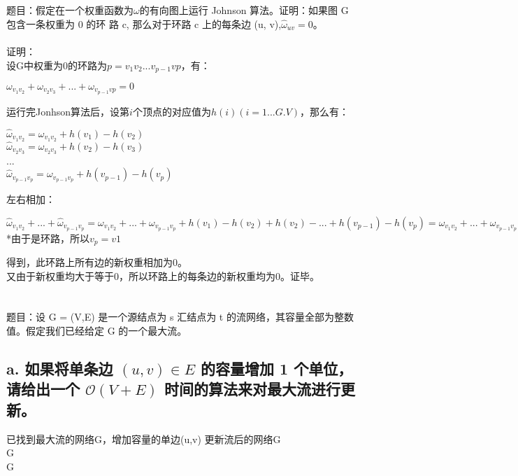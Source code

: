 \documentclass[UTF8]{ctexart}
\begin{document}
\section{}
题目：假定在一个权重函数为$\omega$的有向图上运行 Johnson 算法。证明：如果图 G 包含一条权重为 0 的环
路 c, 那么对于环路 c 上的每条边 (u, v),$\hat{\omega}_{uv}=0$。\\\\
证明：\\
设G中权重为0的环路为$p=v_1v_2...v_{p-1}v{p}$，有：
\begin{center}
$\omega_{v_1v_2}+\omega_{v_2v_3}+...+\omega_{v_{p-1}v{p}}=0$
\end{center}
运行完Jonhson算法后，设第$i$个顶点的对应值为$h(i)(i=1...G.V)$，那么有：
\begin{center}
$\hat{\omega}_{v_1v_2}=\omega_{v_1v_2}+h(v_1)-h(v_2)$\\
$\hat{\omega}_{v_2v_3}=\omega_{v_2v_3}+h(v_2)-h(v_3)$\\
...\\
$\hat{\omega}_{v_{p-1}v_p}=\omega_{v_{p-1}v_p}+h(v_{p-1})-h(v_p)$
\end{center}
左右相加：
\begin{center}
$\hat{\omega}_{v_1v_2}+...+\hat{\omega}_{v_{p-1}v_p}=\omega_{v_1v_2}+...+\omega_{v_{p-1}v_p}+h(v_1)-h(v_2)+h(v_2)-...+h(v_{p-1})-h(v_p)=\omega_{v_1v_2}+...+\omega_{v_{p-1}v_p}=0$\\
*由于是环路，所以$v_p=v1$
\end{center}
得到，此环路上所有边的新权重相加为0。\\
又由于新权重均大于等于0，所以环路上的每条边的新权重均为0。证毕。

\section{}
题目：设 G = (V,E) 是一个源结点为 s 汇结点为 t 的流网络，其容量全部为整数值。假定我们已经给定 G 的一个最大流。
\subsection{a. 如果将单条边 $(u, v)\in E$ 的容量增加 1 个单位，请给出一个 $\mathcal{O}(V+E)$ 时间的算法来对最大流进行更新。}
\renewcommand{\algorithmicrequire}{\textbf{输入:}}
\renewcommand{\algorithmicensure}{\textbf{输出:}}
\begin{algorithm}
	\caption{}
	\begin{algorithmic}[1]
	\Require 已找到最大流的网络G，增加容量的单边(u,v)
	\Ensure 更新流后的网络G
		\\
		\quad\quad\Return G
	\Else
				\Else
				\EndIf
			\EndFor
		\EndIf\\
		\quad\quad\Return G
	\EndIf
	\end{algorithmic}
\end{algorithm}
\end{document}
